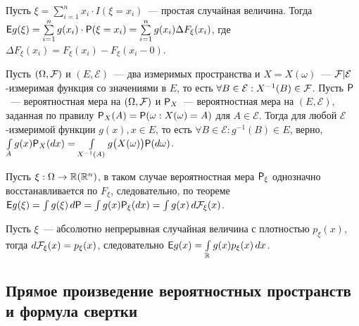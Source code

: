 Пусть $\xi = \sum\limits_{i = 1}^n x_i \cdot I (\xi = x_i)$~--- простая случайная величина. Тогда $\E g(\xi) = \sum\limits_{i=1}^{n} g(x_i) \cdot \P(\xi = x_i) = \sum\limits_{i = 1}^n g(x_i) \Delta F_\xi (x_i)$, где $\Delta F_\xi(x_i) = F_\xi(x_i) - F_\xi (x_i - 0)$.

\begin{theorem}
	Пусть $(\Omega, \F)$ и $(E, \mathcal{E})$~--- два измеримых пространства и $X = X(\omega)$~--- $\F | \mathcal{E}$-измеримая функция со значениями в $E$, то есть $\forall B \in \mathcal{E}: X^{-1}(B) \in \F$. Пусть $\P$~--- вероятностная мера на $(\Omega, \F)$ и $\P_X$~--- вероятностная мера на $(E, \mathcal{E})$, заданная по правилу $\P_X(A) = \P (\omega: X(\omega) = A)$ для $A \in \mathcal{E}$. Тогда для любой $\mathcal{E}$-измеримой функции $g(x), x \in E$, то есть $\forall B \in \mathcal{E}: g^{-1}(B) \in E$, верно, $\int\limits_A g(x) \P_X(dx) = \int\limits_{X^{-1}(A)} g\big( X(\omega) \big) \P(d \omega)$.
\end{theorem}

Пусть $\xi : \Omega \rightarrow \R (\R^n)$, в таком случае вероятностная мера $\P_\xi$ однозначно восстанавливается по $F_\xi$, следовательно, по теореме $\E g(\xi) = \int g(\xi) \, d\P = \int g(x) \P_\xi(dx) = \int g(x) \, d \F_\xi (x)$.

Пусть  $\xi$~--- абсолютно непрерывная случайная величина с плотностью $p_\xi(x)$, тогда $d \F_\xi (x) = p_\xi (x)$, следовательно $\E g(x) = \int\limits_{\R} g(x) p_\xi(x) \, d x$.

\subsection{Прямое произведение вероятностных пространств и формула свертки}

